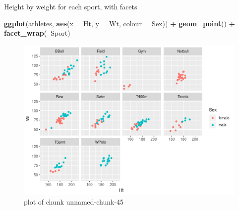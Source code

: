 \documentclass[ignorenonframetext,]{beamer}
\newenvironment{Shaded}{\begin{snugshade}}{\end{snugshade}}
\newcommand{\DataTypeTok}[1]{\textcolor[rgb]{0.13,0.29,0.53}{#1}}
\newcommand{\KeywordTok}[1]{\textcolor[rgb]{0.13,0.29,0.53}{\textbf{#1}}}
\newcommand{\NormalTok}[1]{#1}
\newcommand{\OperatorTok}[1]{\textcolor[rgb]{0.81,0.36,0.00}{\textbf{#1}}}
\newcommand{\StringTok}[1]{\textcolor[rgb]{0.31,0.60,0.02}{#1}}
\begin{document}
\begin{frame}[fragile]{Height by weight for each sport, with facets}
\protect\hypertarget{height-by-weight-for-each-sport-with-facets}{}

\begin{Shaded}
\begin{Highlighting}[]
\KeywordTok{ggplot}\NormalTok{(athletes, }\KeywordTok{aes}\NormalTok{(}\DataTypeTok{x =}\NormalTok{ Ht, }\DataTypeTok{y =}\NormalTok{ Wt, }\DataTypeTok{colour =}\NormalTok{ Sex)) }\OperatorTok{+}
\StringTok{  }\KeywordTok{geom_point}\NormalTok{() }\OperatorTok{+}\StringTok{ }\KeywordTok{facet_wrap}\NormalTok{(}\OperatorTok{~}\NormalTok{Sport)}
\end{Highlighting}
\end{Shaded}

\begin{figure}
\centering
\includegraphics{figure/unnamed-chunk-45-1.png}
\caption{plot of chunk unnamed-chunk-45}
\end{figure}

\end{frame}
\end{document}
